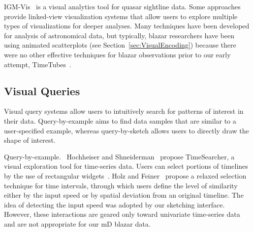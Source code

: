 IGM-Vis~\cite{Burchett2019} is a visual analytics tool for quasar sightline data.
Some approaches~\cite{Haroz2008, Li2008, Preston2016, McCurdy2019, Burchett2019} provide linked-view visualization systems that allow users to explore multiple types of visualizations for deeper analyses.
Many techniques have been developed for analysis of astronomical data, 
but typically, blazar researchers have been using animated scatterplots (see Section~\ref{sec:VisualEncoding}) 
because there were no other effective techniques for blazar observations prior to our early attempt, TimeTubes~\cite{Fujishiro2018}.

\subsection{Visual Queries}\label{sec:relatedFeature}
Visual query systems allow users to intuitively search for patterns of interest in their data.
Query-by-example aims to find data samples that are similar to a user-specified example,
whereas query-by-sketch allows users to directly draw the shape of interest.

\textsf{Query-by-example.\ }
Hochheiser and Shneiderman~\cite{Hochheiser2004} propose TimeSearcher, a visual exploration tool for time-series data. Users can select portions of timelines by the use of rectangular widgets~\cite{Buono2005, Buono2008}.
Holz and Feiner~\cite{Holz2009} propose a relaxed selection technique for time intervals, through which users define the level of similarity either by the input speed or by spatial deviation from an original timeline.
The idea of detecting the input speed was adopted by our sketching interface.
However, these interactions are geared only toward univariate time-series data and are not appropriate for our mD blazar data.
%

